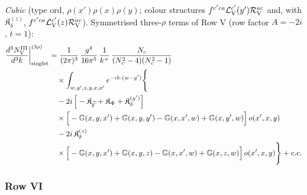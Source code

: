 \documentclass[9pt]{article}
\def\mf#1{\mathbb{#1}}
\numberwithin{equation}{section}
\begin{document}
{\emph{Cubic} (type ord, $\rho(x')\rho(x)\rho(y)$; colour structures $f^{c'ca}\mathcal{L}^{c'}_{\rm V}(y')\mathcal{R}^{ac}_{\rm V}$ and, with $\mathfrak{K}_{\delta}^{(z)}$, $f^{c'ca}\mathcal{L}^{c'}_{\rm V}(z)\mathcal{R}^{ac}_{\rm V}$).
 Symmetrised three-$\rho$ terms of Row V (row factor $A=-2i$, $t=1$):
\begin{align}
\frac{d^{3}N^{\rm III}_{\rm V}}{d^{3}k}\bigg|^{(3\rho)}_{\rm singlet}&=\frac{1}{(2\pi)^{3}}\,\frac{g^{4}}{16\pi^{5}}\,\frac{1}{k^{+}}\,\frac{N_{c}}{(N_{c}^{2}-4)(N_{c}^{2}-1)}\notag\\
&\quad\times\int_{w,y',z,y,x,x'}e^{-ik\cdot(w-y')}\Bigg\{\notag\\
&\quad-2i\,\Big[-\mathfrak{K}_{\widehat{\mathcal{E}}}+\mathfrak{K}_{\Psi}+\mathfrak{K}_{\delta}^{(y')}\Big]\notag\\
&\quad\times\Big[-\mf{G}(x,y,x')+\mf{G}(x,y,y')-\mf{G}(x,x',w)+\mf{G}(x,y',w)\Big]\,o(x',x,y)\notag\\
&\quad-2i\,\mathfrak{K}_{\delta}^{(z)}\notag\\
&\quad\times\Big[-\mf{G}(x,y,x')+\mf{G}(x,y,z)-\mf{G}(x,x',w)+\mf{G}(x,z,w)\Big]\,o(x',x,y)\Bigg\}+{\rm c.c.}\label{eq:s-o-III-V}
\end{align}

\subsubsection*{Row VI}

}
\end{document}
